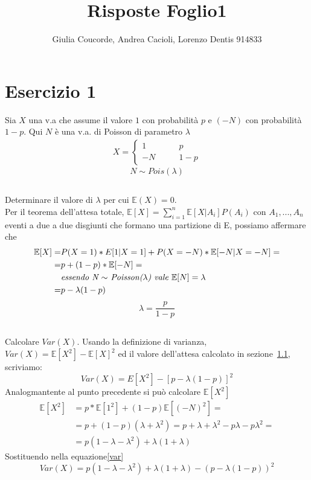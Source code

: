 \documentclass[a4paper]{article}
\newcommand{\E}[0]{\mathbb{E}}
\begin{document}
\author{Giulia Coucorde, Andrea Cacioli, Lorenzo Dentis 914833}
\title{Risposte Foglio1}
\maketitle
\section{Esercizio 1}
Sia $X$ una v.a che assume il valore $1$ con probabilità $p$ e $(-N)$ con probabilità $1 - p$. Qui $N$ è una v.a. di Poisson di parametro $\lambda$
\begin{align}
	X=
	\begin{cases}
		1 \qquad & p\\
		-N \qquad & 1-p
	\end{cases}
\end{align}
$$N \sim Pois(\lambda)$$ 
\subsection{}
\label{SEC:1.a}
Determinare il valore di $\lambda$ per cui $\E(X) = 0$.\\
Per il teorema dell'attesa totale, $\E[X] = \sum_{i=1}^n\E[X|A_i]P(A_i)$ con $A_1, ..., A_n$ eventi a due a due disgiunti che formano una partizione di E, possiamo affermare che
\begin{align*}
	\E[X] = & P(X=1) * E[1 | X=1] + P(X=-N)*\E[-N | X= -N]=\\
	= & p + (1-p) * \E[-N]=\\
	  & \text{\textit{essendo N $\sim$ Poisson($\lambda$) vale $\E[N] = \lambda$}}\\
	= & p - \lambda(1-p) 
\end{align*}
$$\lambda = \frac{p}{1-p}$$
\subsection{}
Calcolare $Var(X)$.
Usando la definizione di varianza, $Var(X) = \E[X^2] - \E[X]^2$  ed il valore dell'attesa calcolato in sezione~\ref{SEC:1.a}, scriviamo:
\begin{equation}\label{var}Var(X) =  E[X^2] - [p - \lambda(1-p)]^2\end{equation} 
Analogmantente al punto precedente si può calcolare $\E[X^2]$
\begin{align*}
	\E[X^2] &= p* \E[1^2] + (1-p)\E[(-N)^2]=\\
		&= p + (1-p)(\lambda + \lambda^2)= p+\lambda +\lambda^2 -p\lambda - p\lambda^2 =\\
		&= p(1-\lambda -\lambda^2) + \lambda(1+\lambda) 
\end{align*}
Sostituendo nella equazione\eqref{var}
$$Var(X) =  p(1-\lambda -\lambda^2) + \lambda(1+\lambda) - (p - \lambda(1-p))^2 $$
\end{document}
